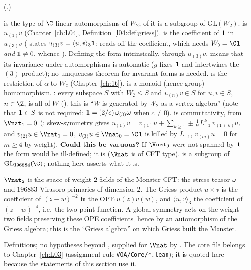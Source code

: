 (.)
\begin{dictionary}
 is the type of $\C$-linear automorphisms of $W_2$;  of it is a
subgroup of $\mathrm{GL}(W_2)$.   is $u_{(1)}v$ (Chapter~\ref{ch:L04},
Definition~\ref{l04:def:griess}).   is the coefficient of $\mathbf 1$ in $u_{(3)}v$
( states $u_{(3)}v=\langle u,v\rangle_3\mathbf 1$;  reads off the
coefficient, which needs $W_0=\C\chtwentyvac$ \emph{and} $\mathbf 1\neq0$, whence ).  Defining the form
intrinsically, through $u_{(3)}v$, means that its invariance under automorphisms is automatic
($g$ fixes $\mathbf 1$ and intertwines the $(3)$-product); no uniqueness theorem for invariant forms is needed.
 is the restriction of $\alpha$ to $W_2$ (Chapter~\ref{ch:16}).   is a monoid (hence
group) homomorphism.  : every subspace $S$ with $W_2\le S$ and $u_{(n)}v\in S$ for
$u,v\in S$, $n\in\Z$, is all of $W$ (); this is ``$W$ is generated by $W_2$ as a vertex algebra'' (note that
$\mathbf 1\in S$ is not required: $\mathbf 1=(2/c)\,\omega_{(3)}\omega$ when $c\ne0$).
 is commutativity, from $\Vnat_1=0$ (: skew-symmetry
gives $u_{(1)}v=v_{(1)}u+\sum_{k\ge1}\pm\tfrac1{k!}L_{-1}^k\,v_{(1+k)}u$, and $v_{(2)}u\in\Vnat_1=0$, $v_{(3)}u\in\Vnat_0=\C\chtwentyvac$
is killed by $L_{-1}$, $v_{(m)}u=0$ for $m\ge4$ by weight).
\textbf{Could this be vacuous?}  If $\Vnat_0$ were not spanned by $\mathbf 1$ the form would be ill-defined; it is
($\Vnat$ is of CFT type).   is a subgroup of $\mathrm{GL}_{196884}(\C)$; nothing here asserts
what it is.
\end{dictionary}
\begin{physics}
$\Vnat_2$ is the space of weight-$2$ fields of the Monster CFT: the stress tensor $\omega$ and $196883$ Virasoro
primaries of dimension $2$.  The Griess product $u\times v$ is the coefficient of $(z-w)^{-2}$ in the OPE $u(z)v(w)$,
and $\langle u,v\rangle_3$ the coefficient of $(z-w)^{-4}$, i.e.\ the two-point function.  A global symmetry acts on
the weight-two fields preserving these OPE coefficients, hence by an automorphism of the Griess algebra; this is the
``Griess algebra'' on which Griess built the Monster.
\end{physics}
\begin{status}
Definitions; no hypotheses beyond , supplied for $\Vnat$ by .  The core file
 belongs to Chapter~\ref{ch:L03} (assignment rule \texttt{VOA/Core/*.lean});
it is quoted here because the statements of this section use it.
\end{status}

